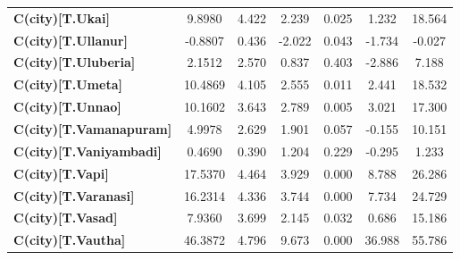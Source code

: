 \begin{center}
\begin{tabular}{lcccccc}
\textbf{C(city)[T.Ukai]}                                                                            &       9.8980  &        4.422     &     2.239  &         0.025        &        1.232    &       18.564     \\
\textbf{C(city)[T.Ullanur]}                                                                         &      -0.8807  &        0.436     &    -2.022  &         0.043        &       -1.734    &       -0.027     \\
\textbf{C(city)[T.Uluberia]}                                                                        &       2.1512  &        2.570     &     0.837  &         0.403        &       -2.886    &        7.188     \\
\textbf{C(city)[T.Umeta]}                                                                           &      10.4869  &        4.105     &     2.555  &         0.011        &        2.441    &       18.532     \\
\textbf{C(city)[T.Unnao]}                                                                           &      10.1602  &        3.643     &     2.789  &         0.005        &        3.021    &       17.300     \\
\textbf{C(city)[T.Vamanapuram]}                                                                     &       4.9978  &        2.629     &     1.901  &         0.057        &       -0.155    &       10.151     \\
\textbf{C(city)[T.Vaniyambadi]}                                                                     &       0.4690  &        0.390     &     1.204  &         0.229        &       -0.295    &        1.233     \\
\textbf{C(city)[T.Vapi]}                                                                            &      17.5370  &        4.464     &     3.929  &         0.000        &        8.788    &       26.286     \\
\textbf{C(city)[T.Varanasi]}                                                                        &      16.2314  &        4.336     &     3.744  &         0.000        &        7.734    &       24.729     \\
\textbf{C(city)[T.Vasad]}                                                                           &       7.9360  &        3.699     &     2.145  &         0.032        &        0.686    &       15.186     \\
\textbf{C(city)[T.Vautha]}                                                                          &      46.3872  &        4.796     &     9.673  &         0.000        &       36.988    &       55.786     \\

\end{tabular}
\end{center}
